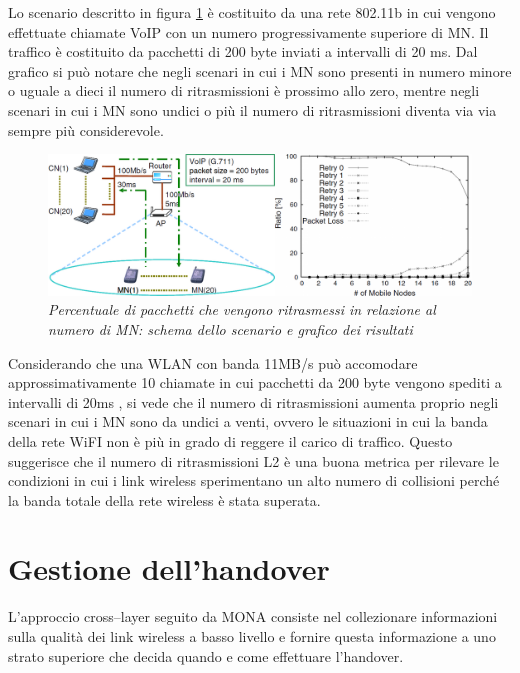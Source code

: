 \documentclass[12pt,a4paper,openright,twoside]{book}
\begin{document}
Lo scenario descritto in figura \ref{fig:mona-collision-simulation} è
costituito da una rete 802.11b in cui vengono effettuate chiamate VoIP
con un numero progressivamente superiore di MN. Il traffico è
costituito da pacchetti di 200 byte inviati a intervalli di 20 ms. Dal
grafico si può notare che negli scenari in cui i MN sono presenti in
numero minore o uguale a dieci il numero di ritrasmissioni è prossimo
allo zero, mentre negli scenari in cui i MN sono undici o più il
numero di ritrasmissioni diventa via via sempre più considerevole.

\begin{figure}[tb]
\centering
\includegraphics[width=\textwidth]{img/mona-collision-simulation}
\caption{\em Percentuale di pacchetti che vengono ritrasmessi in relazione
  al numero di MN: schema dello scenario e grafico dei risultati}
\label{fig:mona-collision-simulation}
\end{figure}

Considerando che una WLAN con banda 11MB/s può accomodare
approssimativamente 10 chiamate in cui pacchetti da 200 byte vengono
spediti a intervalli di 20ms \cite{bib:banda-wlan}, si vede che il
numero di ritrasmissioni aumenta proprio negli scenari in cui i MN
sono da undici a venti, ovvero le situazioni in cui la banda della
rete WiFI non è più in grado di reggere il carico di traffico. Questo
suggerisce che il numero di ritrasmissioni L2 è una buona metrica per
rilevare le condizioni in cui i link wireless sperimentano un alto
numero di collisioni perché la banda totale della rete wireless è
stata superata.

\section{Gestione dell'handover}

L'approccio cross--layer seguito da MONA consiste nel collezionare
informazioni sulla qualità dei link wireless a basso livello e fornire
questa informazione a uno strato superiore che decida quando e come
effettuare l'handover.
\end{document}
